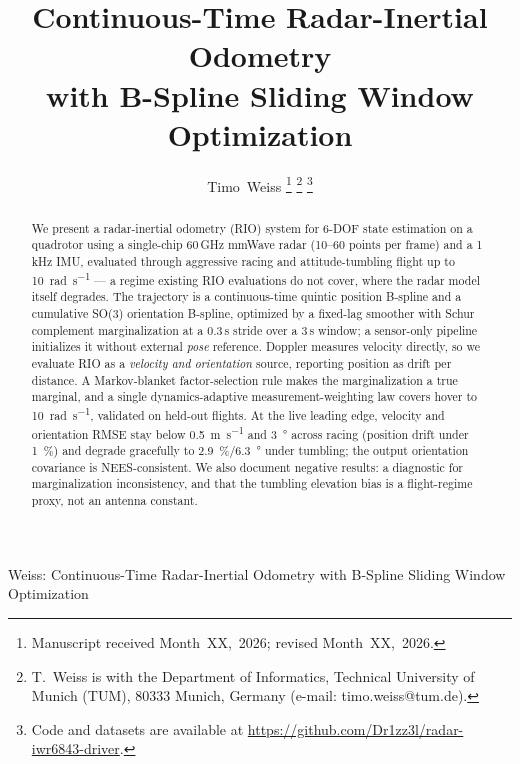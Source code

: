 \documentclass[journal]{IEEEtran}
\begin{document}
\title{Continuous-Time Radar-Inertial Odometry\\with B-Spline Sliding Window Optimization}

\author{Timo~Weiss%
\thanks{Manuscript received Month~XX,~2026; revised Month~XX,~2026.}%
\thanks{T.~Weiss is with the Department of Informatics, Technical
University of Munich (TUM), 80333 Munich, Germany (e-mail:
timo.weiss@tum.de).}%
\thanks{Code and datasets are available at
\protect\url{https://github.com/Dr1zz3l/radar-iwr6843-driver}.}}

%
{Weiss: Continuous-Time Radar-Inertial Odometry with B-Spline Sliding Window Optimization}

\maketitle

\begin{abstract}
We present a radar-inertial odometry (RIO) system for 6-DOF state
estimation on a quadrotor using a single-chip 60\,GHz mmWave radar
(10--60 points per frame) and a 1\,kHz IMU, evaluated through aggressive
racing and attitude-tumbling flight up to \SI{10}{\radian\per\second}
--- a regime existing RIO evaluations do not cover, where the radar
model itself degrades.  The trajectory is a continuous-time quintic
position B-spline and a cumulative SO(3) orientation B-spline, optimized
by a fixed-lag smoother with Schur complement marginalization at a
0.3\,s stride over a 3\,s window; a sensor-only pipeline initializes it
without external \emph{pose} reference.  Doppler measures velocity
directly, so we evaluate RIO as a \emph{velocity and orientation}
source, reporting position as drift per distance.  A Markov-blanket
factor-selection rule makes the marginalization a true marginal, and a
single dynamics-adaptive measurement-weighting law covers hover to
\SI{10}{\radian\per\second}, validated on held-out flights.  At the live
leading edge, velocity and orientation RMSE stay below
\SI{0.5}{\metre\per\second} and \SI{3}{\degree} across racing (position
drift under \SI{1}{\percent}) and degrade gracefully to
\SI{2.9}{\percent}/\SI{6.3}{\degree} under tumbling; the output
orientation covariance is NEES-consistent.  We also document negative
results: a diagnostic for marginalization inconsistency, and that the
tumbling elevation bias is a flight-regime proxy, not an antenna
constant.
\end{abstract}
\end{document}

